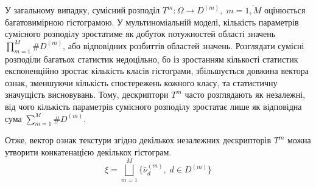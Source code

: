 У загальному випадку, сумісний розподіл $T^m\colon \Omega \to D^{(m)}, \; m=\overline{1,M}$ оцінюється багатовимірною гістограмою. 
У мультиноміальній моделі, кількість параметрів сумісного розподілу зростатиме як добуток потужностей області значень $\prod_{m=1}^M \# D^{(m)}$, або відповідних розбиттів областей значень.
Розглядати сумісні розподіли багатьох статистик недоцільно, бо із зростанням кількості статистик експоненційно зростає кількість класів гістограми, 
збільшується довжина вектора ознак, зменшуючи кількість спостережень кожного класу, та статистичну значущість висновувань.
Тому, дескриптори $T^m$ часто розглядають як незалежні, від чого кількість параметрів сумісного розподілу зростатає лише як відповідна сума $\sum_{m=1}^M \# D^{(m)}$.

Отже, вектор ознак текстури згідно декількох незалежних дескрипторів $T^m$ можна утворити конкатенацією декількох гістограм.
\begin{equation*}
    \xi = \bigsqcup_{m=1}^M \{\hat \nu^{(m)}_d, \; d\in D^{(m)}\}
\end{equation*}




